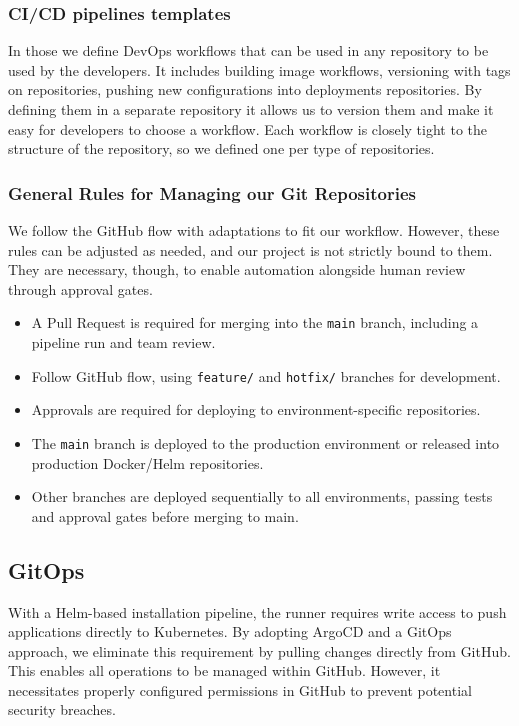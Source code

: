 \subsubsection{CI/CD pipelines templates}
In those we define DevOps workflows that can be used in any repository to be used by the developers.
It includes building image workflows, versioning with tags on repositories, pushing new configurations into deployments repositories.
By defining them in a separate repository it allows us to version them and make it easy for developers to choose a workflow.
Each workflow is closely tight to the structure of the repository, so we defined one per type of repositories.


\subsubsection{General Rules for Managing our Git Repositories}
We follow the GitHub flow with adaptations to fit our workflow.
However, these rules can be adjusted as needed, and our project is not strictly bound to them.
They are necessary, though, to enable automation alongside human review through approval gates.

\begin{itemize}
    \item A Pull Request is required for merging into the \texttt{main} branch, including a pipeline run and team review.
    \item Follow GitHub flow, using \texttt{feature/} and \texttt{hotfix/} branches for development.
    \item Approvals are required for deploying to environment-specific repositories.
    \item The \texttt{main} branch is deployed to the production environment or released into production Docker/Helm repositories.
    \item Other branches are deployed sequentially to all environments, passing tests and approval gates before merging to main.
\end{itemize}

\subsection{GitOps}\label{subsec:gitops2}
With a Helm-based installation pipeline, the runner requires write access to push applications directly to Kubernetes.
By adopting ArgoCD and a GitOps approach, we eliminate this requirement by pulling changes directly from GitHub.
This enables all operations to be managed within GitHub.
However, it necessitates properly configured permissions in GitHub to prevent potential security breaches.

